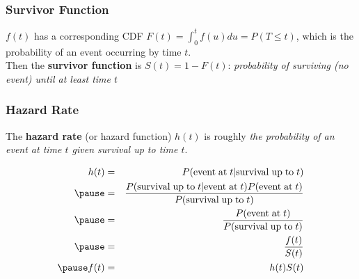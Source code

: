 \documentclass[handout]{beamer}
\begin{document}
\begin{frame}
\frametitle{Survivor Function}
\pause
$f(t)$ has a corresponding CDF $F(t) = \int_0^t f(u) du = P(T \le t)$,
which is the probability of an event occurring by time $t$.\\
\pause
\bigskip
Then the \textbf{survivor function} is $S(t) = 1 - F(t)$:
\emph{probability of surviving (no event) until at least time $t$}
\pause
\begin{figure}
\begin{center}
\end{center}
\end{figure}
\end{frame}

\begin{frame}
\frametitle{Hazard Rate}
\pause
The \textbf{hazard rate} (or hazard function) $h(t)$ is roughly \emph{the
probability of an event at time $t$ given survival up to time $t$}.\\
\pause

\begin{eqnarray*}
h(t) &=& P(\mathrm{event \; at}\; t | \mathrm{survival \; up \; to} \; t)\\
\pause
&=& \frac{P(\mathrm{survival \; up \; to\; } t | \mathrm{event \; at}
\; t)P(\mathrm{event \; at} \; t)}{P(\mathrm{survival \; up \; to} \; t)}\\
\pause
&=& \frac{P(\mathrm{event \; at \; }t)}{P(\mathrm{survival \; up \;
to} \;  t)}\\
\pause
&=& \frac{f(t)}{S(t)}\\
\pause
f(t) &=& h(t) S(t) 
\end{eqnarray*}
\end{frame}
\end{document}
